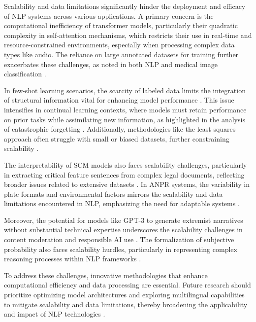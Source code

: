 Scalability and data limitations significantly hinder the deployment and efficacy of NLP systems across various applications. A primary concern is the computational inefficiency of transformer models, particularly their quadratic complexity in self-attention mechanisms, which restricts their use in real-time and resource-constrained environments, especially when processing complex data types like audio. The reliance on large annotated datasets for training further exacerbates these challenges, as noted in both NLP and medical image classification \cite{zolfaghari2023surveyautomateddetectionclassification}.

In few-shot learning scenarios, the scarcity of labeled data limits the integration of structural information vital for enhancing model performance \cite{ge2024psppretrainingstructureprompt}. This issue intensifies in continual learning contexts, where models must retain performance on prior tasks while assimilating new information, as highlighted in the analysis of catastrophic forgetting \cite{goldfarb2022analysiscatastrophicforgettingrandom}. Additionally, methodologies like the least squares approach often struggle with small or biased datasets, further constraining scalability \cite{peiris2021deeplearningnonsmoothobjectives}.

The interpretability of SCM models also faces scalability challenges, particularly in extracting critical feature sentences from complex legal documents, reflecting broader issues related to extensive datasets \cite{lin2023interpretabilityframeworksimilarcase}. In ANPR systems, the variability in plate formats and environmental factors mirrors the scalability and data limitations encountered in NLP, emphasizing the need for adaptable systems \cite{adak2022automaticnumberplaterecognition}.

Moreover, the potential for models like GPT-3 to generate extremist narratives without substantial technical expertise underscores the scalability challenges in content moderation and responsible AI use \cite{mcguffie2020radicalizationrisksgpt3advanced}. The formalization of subjective probability also faces scalability hurdles, particularly in representing complex reasoning processes within NLP frameworks \cite{cieslinski2022axiomstypefreesubjectiveprobability}.

To address these challenges, innovative methodologies that enhance computational efficiency and data processing are essential. Future research should prioritize optimizing model architectures and exploring multilingual capabilities to mitigate scalability and data limitations, thereby broadening the applicability and impact of NLP technologies \cite{chowdhery2023palm}.

